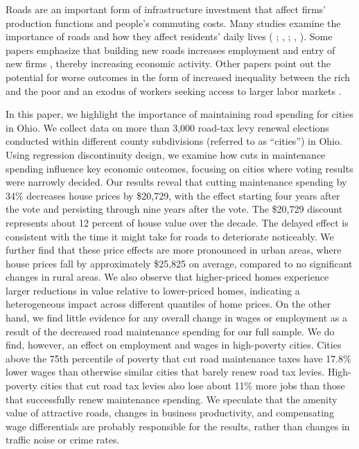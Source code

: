 Roads are an important form of infrastructure investment that affect firms’ production functions and people’s commuting costs. Many studies examine the importance of roads and how they affect residents' daily lives ( \citeyear{currier2023};  \citeyear{adukia2020},  \citeyear{banerjee2020};  \citeyear{banerjee2020},  \citeyear{banerjee2020}). Some papers emphasize that building new roads increases employment and entry of new firms \citep{gibbons2019new}, thereby increasing economic activity. Other papers point out the potential for worse outcomes in the form of increased inequality between the rich and the poor \citep{hettige2006} and an exodus of workers seeking access to larger labor markets \citep{asher2020}.  
 
In this paper, we highlight the importance of maintaining road spending for cities in Ohio. We collect data on more than 3,000 road-tax levy renewal elections conducted within different county subdivisions (referred to as “cities”)  in Ohio. Using regression discontinuity design, we examine how cuts in maintenance spending influence key economic outcomes, focusing on cities where voting results were narrowly decided. Our results reveal that cutting maintenance spending by 34\% decreases house prices by \$20,729, with the effect starting four years after the vote and persisting through nine years after the vote. The \$20,729 discount represents about 12 percent of house value over the decade.  The delayed effect is consistent with the time it might take for roads to deteriorate noticeably.  We further find that these price effects are more pronounced in urban areas, where house prices fall by approximately \$25,825 on average, compared to no significant changes in rural areas. We also observe that higher-priced homes experience larger reductions in value relative to lower-priced homes, indicating a heterogeneous impact across different quantiles of home prices. On the other hand, we find little evidence for any overall change in wages or employment as a result of the decreased road maintenance spending for our full sample.  We do find, however, an effect on employment and wages in high-poverty cities.  Cities above the 75th percentile of poverty that cut road maintenance taxes have 17.8\% lower wages than otherwise similar cities that barely renew road tax levies.  High-poverty cities that cut road tax levies also lose about 11\% more jobs than those that successfully renew maintenance spending.  We speculate that the amenity value of attractive roads, changes in business productivity, and compensating wage differentials are probably responsible for the results, rather than changes in traffic noise or crime rates.

